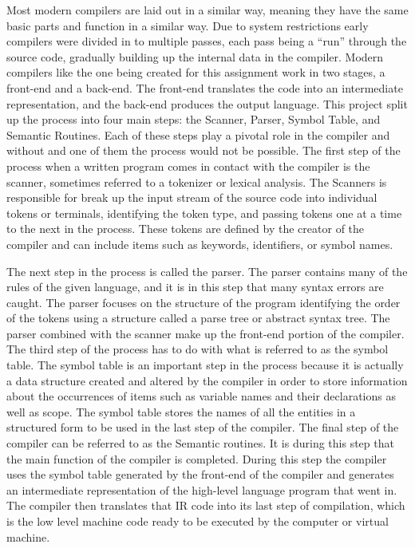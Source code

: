 \documentclass[12pt, oneside]{article}   	%
\begin{document}
Most modern compilers are laid out in a similar way, meaning they have
the same basic parts and function in a similar way. Due to system restrictions
early compilers were divided in to multiple passes, each pass being a “run”
through the source code, gradually building up the internal data in the compiler.
Modern compilers like the one being created for this assignment work in two
stages, a front-end and a back-end. The front-end translates the code into an
intermediate representation, and the back-end produces the output language.
This project split up the process into four main steps: the Scanner, Parser,
Symbol Table, and Semantic Routines. Each of these steps play a pivotal role in
the compiler and without and one of them the process would not be possible. The
first step of the process when a written program comes in contact with the
compiler is the scanner, sometimes referred to a tokenizer or lexical analysis.
The Scanners is responsible for break up the input stream of the source code
into individual tokens or terminals, identifying the token type, and passing tokens
one at a time to the next in the process. These tokens are defined by the creator
of the compiler and can include items such as keywords, identifiers, or symbol
names.

The next step in the process is called the parser. The parser contains
many of the rules of the given language, and it is in this step that many syntax
errors are caught. The parser focuses on the structure of the program identifying
the order of the tokens using a structure called a parse tree or abstract syntax
tree. The parser combined with the scanner make up the front-end portion of the
compiler. The third step of the process has to do with what is referred to as the
symbol table. The symbol table is an important step in the process because it is
actually a data structure created and altered by the compiler in order to store
information about the occurrences of items such as variable names and their
declarations as well as scope. The symbol table stores the names of all the
entities in a structured form to be used in the last step of the compiler.
The final step of the compiler can be referred to as the Semantic
routines. It is during this step that the main function of the compiler is completed.
During this step the compiler uses the symbol table generated by the front-end of
the compiler and generates an intermediate representation of the high-level
language program that went in. The compiler then translates that IR code into its
last step of compilation, which is the low level machine code ready to be
executed by the computer or virtual machine.
\end{document}
